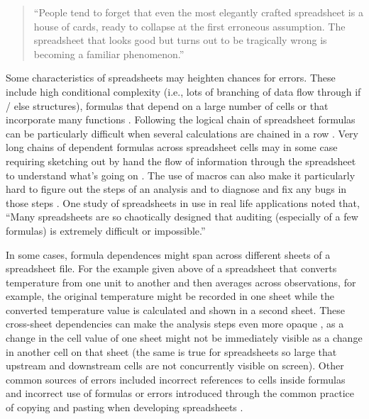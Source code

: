 \documentclass[]{tufte-book}
\begin{document}
\begin{quote}
``People tend to forget that even the most elegantly crafted spreadsheet is a
house of cards, ready to collapse at the first erroneous assumption. The
spreadsheet that looks good but turns out to be tragically wrong is becoming
a familiar phenomenon.'' \citep{levy1984spreadsheet}
\end{quote}

Some characteristics of spreadsheets may heighten chances for errors. These
include high conditional complexity (i.e., lots of branching of data flow
through if / else structures), formulas that depend on a large number of cells
or that incorporate many functions \citep{hermans2016spreadsheets}. Following the
logical chain of spreadsheet formulas can be particularly difficult when several
calculations are chained in a row \citep{hermans2015enron}. Very long chains of
dependent formulas across spreadsheet cells may in some case requiring sketching
out by hand the flow of information through the spreadsheet to understand what's
going on \citep{nardi1990spreadsheet}. The use of macros can also make it
particularly hard to figure out the steps of an analysis and to diagnose and fix
any bugs in those steps \citep{nash2006spreadsheets, creeth1985microcomputer}. One
study of spreadsheets in use in real life applications noted that, ``Many
spreadsheets are so chaotically designed that auditing (especially of a few
formulas) is extremely difficult or impossible.'' \citep{powell2009errors}

In some cases, formula dependences might span across different sheets of a
spreadsheet file. For the example given above of a spreadsheet that converts
temperature from one unit to another and then averages across observations, for
example, the original temperature might be recorded in one sheet while the
converted temperature value is calculated and shown in a second sheet. These
cross-sheet dependencies can make the analysis steps even more opaque
\citep{hermans2016spreadsheets}, as a change in the cell value of one sheet might not
be immediately visible as a change in another cell on that sheet (the same is
true for spreadsheets so large that upstream and downstream cells are not
concurrently visible on screen). Other common sources of errors included
incorrect references to cells inside formulas and incorrect use of formulas
\citep{powell2009errors} or errors introduced through the common practice of copying
and pasting when developing spreadsheets \citep{hermans2016spreadsheets}.
\end{document}
